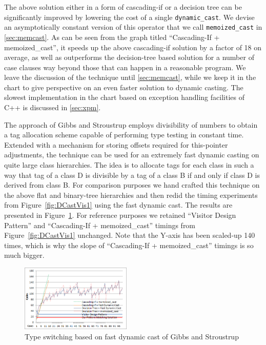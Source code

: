 \documentclass[preprint]{sigplanconf}
\makeatletter
\DeclareRobustCommand{\code}[1]{{\lstinline[breaklines=false,escapechar=@]{#1}}}
\makeatother
\begin{document}
The above solution either in a form of cascading-if or a decision tree can be 
significantly improved by lowering the cost of a single \code{dynamic_cast}. 
We devise an asymptotically constant version of this operator that we call
\code{memoized_cast} in \textsection\ref{sec:memcast}. As can be seen from the graph 
titled ``Cascading-If + memoized\_cast'', it speeds up the above cascading-if 
solution by a factor of 18 on average, as well as outperforms the decision-tree 
based solution for a number of case clauses way beyond those that can happen in 
a reasonable program. We leave the discussion of the technique until 
\textsection\ref{sec:memcast}, while we keep it in the chart to give perspective on 
an even faster solution to dynamic casting. The slowest implementation in the 
chart based on exception handling facilities of C++ is discussed in 
\textsection\ref{sec:xpm}.

The approach of Gibbs and Stroustrup employs divisibility of numbers to obtain a 
tag allocation scheme capable of performing type testing in constant time. 
Extended with a mechanism for storing offsets required for this-pointer 
adjustments, the technique can be used for an extremely fast dynamic casting on 
quite large class hierarchies\cite{FastDynCast}. The idea is to allocate tags 
for each class in such a way that tag of a class D is divisible by a tag of a 
class B if and only if class D is derived from class B. For comparison purposes 
we hand crafted this technique on the above flat and binary-tree hierarchies and 
then redid the timing experiments from Figure~\ref{fig:DCastVis1} using the fast 
dynamic cast. The results are presented in Figure~\ref{fig:DCastVis2}. For 
reference purposes we retained ``Visitor Design Pattern'' and ``Cascading-If + 
memoized\_cast'' timings from Figure~\ref{fig:DCastVis1} unchanged. Note that 
the Y-axis has been scaled-up 140 times, which is why the slope of 
``Cascading-If + memoized\_cast'' timings is so much bigger.

\begin{figure}[htbp]
  \centering
    \includegraphics[width=0.47\textwidth]{DCast-vs-Visitors2.png}
  \caption{Type switching based on fast dynamic cast of Gibbs and Stroustrup\cite{FastDynCast}}
  \label{fig:DCastVis2}
\end{figure}
\end{document}
